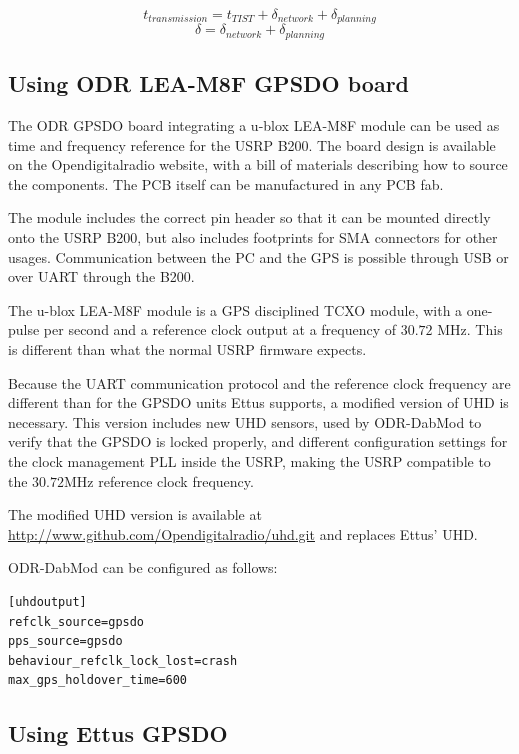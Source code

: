 \[
    t_{transmission} = t_{TIST} + \delta_{network} + \delta_{planning}
\]
\[
    \delta = \delta_{network} + \delta_{planning}
\]


\subsection{Using ODR LEA-M8F GPSDO board}

The ODR GPSDO board integrating a u-blox LEA-M8F module can be used as time and
frequency reference for the USRP B200. 
The board design is available on the Opendigitalradio website, with
a bill of materials describing how to source the components. The PCB itself can
be manufactured in any PCB fab.

The module includes the correct pin header so that it can be mounted directly
onto the USRP B200, but also includes footprints for SMA connectors for other
usages. Communication between the PC and the GPS is possible through USB or over
UART through the B200.

The u-blox LEA-M8F module is a GPS disciplined TCXO module, with a one-pulse per
second and a reference clock output at a frequency of $30.72$ MHz. This is
different than what the normal USRP firmware expects.

Because the UART communication protocol and the reference clock frequency are
different than for the GPSDO units Ettus supports, a modified version of UHD is
necessary. This version includes new UHD sensors, used by ODR-DabMod to verify
that the GPSDO is locked properly, and different configuration settings for the
clock management PLL inside the USRP, making the USRP compatible to the
$30.72$MHz reference clock frequency.

The modified UHD version is available at
\url{http://www.github.com/Opendigitalradio/uhd.git} and replaces Ettus' UHD.

ODR-DabMod can be configured as follows:
\begin{lstlisting}
[uhdoutput]
refclk_source=gpsdo
pps_source=gpsdo
behaviour_refclk_lock_lost=crash
max_gps_holdover_time=600
\end{lstlisting}


\subsection{Using Ettus GPSDO}


